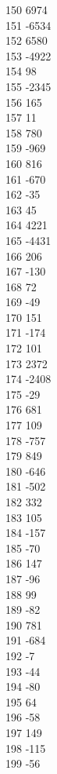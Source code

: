 { 150	6974 \\
 151	-6534 \\
 152	6580 \\
 153	-4922 \\
 154	98 \\
 155	-2345 \\
 156	165 \\
 157	11 \\
 158	780 \\
 159	-969 \\
 160	816 \\
 161	-670 \\
 162	-35 \\
 163	45 \\
 164	4221 \\
 165	-4431 \\
 166	206 \\
 167	-130 \\
 168	72 \\
 169	-49 \\
 170	151 \\
 171	-174 \\
 172	101 \\
 173	2372 \\
 174	-2408 \\
 175	-29 \\
 176	681 \\
 177	109 \\
 178	-757 \\
 179	849 \\
 180	-646 \\
 181	-502 \\
 182	332 \\
 183	105 \\
 184	-157 \\
 185	-70 \\
 186	147 \\
 187	-96 \\
 188	99 \\
 189	-82 \\
 190	781 \\
 191	-684 \\
 192	-7 \\
 193	-44 \\
 194	-80 \\
 195	64 \\
 196	-58 \\
 197	149 \\
 198	-115 \\
 199	-56 \\
}
